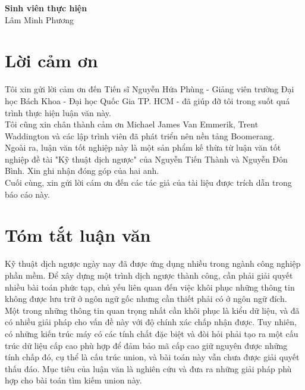 \documentclass[12pt]{report}
\begin{document}
	\hspace*{8cm}\textbf{Sinh viên thực hiện}
	\\[10ex]
	\hspace*{9cm}Lâm Minh Phương
		
	\chapter*{Lời cảm ơn}
	Tôi xin gửi lời cảm ơn đến Tiến sĩ Nguyễn Hứa Phùng - Giảng viên trường Đại học Bách Khoa - Đại học Quốc Gia TP. HCM - đã giúp đỡ tôi trong suốt quá trình thực hiện luận văn này.\\
	Tôi cũng xin chân thành cảm ơn Michael James Van Emmerik, Trent Waddington và các lập trình viên đã phát triển nên nền tảng Boomerang.\\
	Ngoài ra, luận văn tốt nghiệp này là một sản phẩm kế thừa từ luận văn tốt nghiệp đề tài "Kỹ thuật dịch ngược" của Nguyễn Tiến Thành và Nguyễn Đôn Bình. Xin ghi nhận đóng góp của hai anh.\\
	Cuối cùng, xin gửi lời cám ơn đến các tác giả của tài liệu được trích dẫn trong báo cáo này. 
	
	\newpage
	\chapter*{Tóm tắt luận văn}
	Kỹ thuật dịch ngược ngày nay đã được ứng dụng nhiều trong ngành công nghiệp phần mềm. Để xây dựng một trình dịch ngược thành công, cần phải giải quyết nhiều bài toán phức tạp, chủ yếu liên quan đến việc khôi phục những thông tin không được lưu trữ ở ngôn ngữ gốc nhưng cần thiết phải có ở ngôn ngữ đích. Một trong những thông tin quan trọng nhất cần khôi phục là kiểu dữ liệu, và đã có nhiều giải pháp cho vấn đề này với độ chính xác chấp nhận được. Tuy nhiên, có những kiến trúc máy có các tính chất đặc biệt và đòi hỏi phải tạo ra một cấu trúc dữ liệu cấp cao phù hợp để đảm bảo mã cấp cao giữ nguyên được những tính chấp đó, cụ thể là cấu trúc union, và bài toán này vẫn chưa được giải quyết thấu đáo. Mục tiêu của luận văn là nghiên cứu và đưa ra những giải pháp phù hợp cho bài toán tìm kiếm union này.
	
	
	\newpage
	\tableofcontents
	
	\newpage
	\listoffigures
	
	\newpage
	\lstlistoflistings
	
	\newpage
	
	
	
	
	
	
	
	\newpage
	\nocite{*}
	\printbibliography
\end{document}
